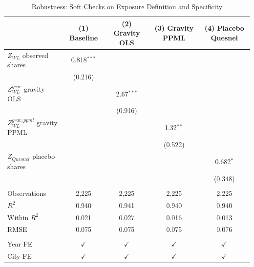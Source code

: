 \begin{table}[htbp]
   \caption{\label{tab:soft_checks} Robustness: Soft Checks on Exposure Definition and Specificity}
   \bigskip
   \centering
   \begin{tabular}{lcccc}
      \toprule
                                        & (1) Baseline & (2) Gravity OLS & (3) Gravity PPML & (4) Placebo Quesnel \\  
      \midrule 
      $Z_{WL}$ observed shares          & 0.818$^{***}$ &               &               &   \\   
                                        & (0.216)       &               &               &   \\   
      $Z_{WL}^{grav}$ gravity OLS       &               & 2.67$^{***}$  &               &   \\   
                                        &               & (0.916)       &               &   \\   
      $Z_{WL}^{grav,ppml}$ gravity PPML &               &               & 1.32$^{**}$   &   \\   
                                        &               &               & (0.522)       &   \\   
      $Z_{Quesnel}$ placebo shares      &               &               &               & 0.682$^{*}$\\   
                                        &               &               &               & (0.348)\\   
       \\
      Observations                      & 2,225         & 2,225         & 2,225         & 2,225\\  
      $R^2$                             & 0.940         & 0.941         & 0.940         & 0.940\\  
      Within $R^2$                      & 0.021         & 0.027         & 0.016         & 0.013\\  
      RMSE                              & 0.075         & 0.075         & 0.075         & 0.076\\  
       \\
      Year FE                           & $\checkmark$  & $\checkmark$  & $\checkmark$  & $\checkmark$\\   
      City FE                           & $\checkmark$  & $\checkmark$  & $\checkmark$  & $\checkmark$\\   
      \bottomrule
   \end{tabular}
   

\end{table}
